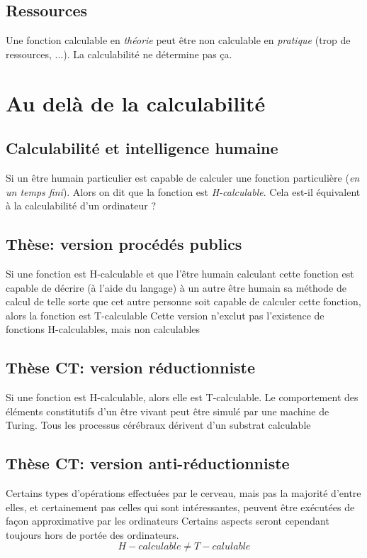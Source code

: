 \documentclass{report}
\begin{document}
\subsection{Ressources}
Une fonction calculable en \textit{théorie} peut être non calculable en \textit{pratique} (trop de ressources, ...). La calculabilité ne détermine pas ça.

\section{Au delà de la calculabilité}
\subsection{Calculabilité et intelligence humaine}
Si un être humain particulier est capable de calculer une fonction particulière (\textit{en un temps fini}). Alors on dit que la fonction est \textit{H-calculable}. Cela est-il équivalent à la calculabilité d'un ordinateur ?

\subsection{Thèse: version procédés publics}
Si une fonction est H-calculable et que l'être humain calculant cette fonction
est capable de décrire (à l'aide du langage) à un autre être humain sa
méthode de calcul de telle sorte que cet autre personne soit capable de
calculer cette fonction,
alors la fonction est T-calculable
Cette version n'exclut pas l'existence de fonctions H-calculables, mais non
calculables

\subsection{Thèse CT: version réductionniste}
Si une fonction est H-calculable, alors elle est T-calculable. Le comportement des éléments constitutifs d'un être vivant peut être simulé
par une machine de Turing. Tous les processus cérébraux dérivent d’un substrat calculable

\subsection{Thèse CT:  version anti-réductionniste}
Certains types d'opérations effectuées par le cerveau, mais pas la majorité d'entre elles, et certainement pas celles qui sont intéressantes, peuvent être exécutées de façon approximative par les ordinateurs Certains aspects seront cependant toujours hors de portée des ordinateurs.
\begin{equation}
H-calculable \neq T-calulable
\end{equation}
\end{document}
